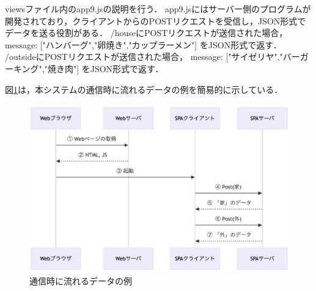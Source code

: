 \documentclass[uplatex,dvipdfmx]{jsarticle}
\begin{document}
viewsファイル内のapp9.jsの説明を行う．
app9.jsにはサーバー側のプログラムが開発されており，クライアントからのPOSTリクエストを受信し，JSON形式でデータを送る役割がある．
/houseにPOSTリクエストが送信された場合，{ message: ["ハンバーグ","卵焼き","カップラーメン"] }をJSON形式で返す．
/outsideにPOSTリクエストが送信された場合，{ message: ["サイゼリヤ","バーガーキング","焼き肉"] }をJSON形式で返す．

図\ref{fig:flowchart}は，本システムの通信時に流れるデータの例を簡易的に示している．
\begin{figure}[h]
    \centering
     \centering
    \includegraphics[width=13cm]{fig/flowchart.png}
    \caption{通信時に流れるデータの例}
    \label{fig:flowchart}
  \end{figure}
\clearpage
\end{document}
